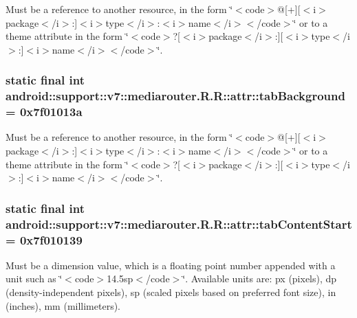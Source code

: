 Must be a reference to another resource, in the form \char`\"{}$<$code$>$@\mbox{[}+\mbox{]}\mbox{[}$<$i$>$package$<$/i$>$:\mbox{]}$<$i$>$type$<$/i$>$:$<$i$>$name$<$/i$>$$<$/code$>$\char`\"{} or to a theme attribute in the form \char`\"{}$<$code$>$?\mbox{[}$<$i$>$package$<$/i$>$:\mbox{]}\mbox{[}$<$i$>$type$<$/i$>$:\mbox{]}$<$i$>$name$<$/i$>$$<$/code$>$\char`\"{}. \hypertarget{classandroid_1_1support_1_1v7_1_1mediarouter_1_1_r_1_1attr_af826de51f9110daa04c2c60a140d614}{
\subsubsection[{tabBackground}]{\setlength{\rightskip}{0pt plus 5cm}static final int android::support::v7::mediarouter.R.R::attr::tabBackground = 0x7f01013a}}
\label{classandroid_1_1support_1_1v7_1_1mediarouter_1_1_r_1_1attr_af826de51f9110daa04c2c60a140d614}


Must be a reference to another resource, in the form \char`\"{}$<$code$>$@\mbox{[}+\mbox{]}\mbox{[}$<$i$>$package$<$/i$>$:\mbox{]}$<$i$>$type$<$/i$>$:$<$i$>$name$<$/i$>$$<$/code$>$\char`\"{} or to a theme attribute in the form \char`\"{}$<$code$>$?\mbox{[}$<$i$>$package$<$/i$>$:\mbox{]}\mbox{[}$<$i$>$type$<$/i$>$:\mbox{]}$<$i$>$name$<$/i$>$$<$/code$>$\char`\"{}. \hypertarget{classandroid_1_1support_1_1v7_1_1mediarouter_1_1_r_1_1attr_b8a25c559e86b244184cfd5f0140d284}{
\subsubsection[{tabContentStart}]{\setlength{\rightskip}{0pt plus 5cm}static final int android::support::v7::mediarouter.R.R::attr::tabContentStart = 0x7f010139}}
\label{classandroid_1_1support_1_1v7_1_1mediarouter_1_1_r_1_1attr_b8a25c559e86b244184cfd5f0140d284}


Must be a dimension value, which is a floating point number appended with a unit such as \char`\"{}$<$code$>$14.5sp$<$/code$>$\char`\"{}. Available units are: px (pixels), dp (density-independent pixels), sp (scaled pixels based on preferred font size), in (inches), mm (millimeters). 

